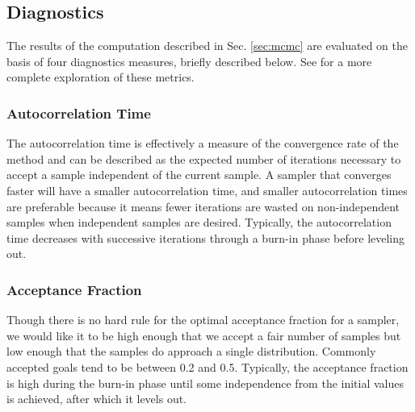 \documentclass[preprint]{aastex}
\begin{document}

\subsection{Diagnostics}
\label{sec:diag}

The results of the computation described in Sec. \ref{sec:mcmc} are evaluated on the basis of four diagnostics measures, briefly described below.  See \citet{for12} for a more complete exploration of these metrics.

\subsubsection{Autocorrelation Time}
\label{sec:acorr}

The autocorrelation time is effectively a measure of the convergence rate of the method and can be described as the expected number of iterations necessary to accept a sample independent of the current sample.  A sampler that converges faster will have a smaller autocorrelation time, and smaller autocorrelation times are preferable because it means fewer iterations are wasted on non-independent samples when independent samples are desired.  Typically, the autocorrelation time decreases with successive iterations through a burn-in phase before leveling out.

\subsubsection{Acceptance Fraction}
\label{sec:afrac}

Though there is no hard rule for the optimal acceptance fraction for a sampler, we would like it to be high enough that we accept a fair number of samples but low enough that the samples do approach a single distribution.  Commonly accepted goals tend to be between 0.2 and 0.5.  Typically, the acceptance fraction is high during the burn-in phase until some independence from the initial values is achieved, after which it levels out.
\end{document}
